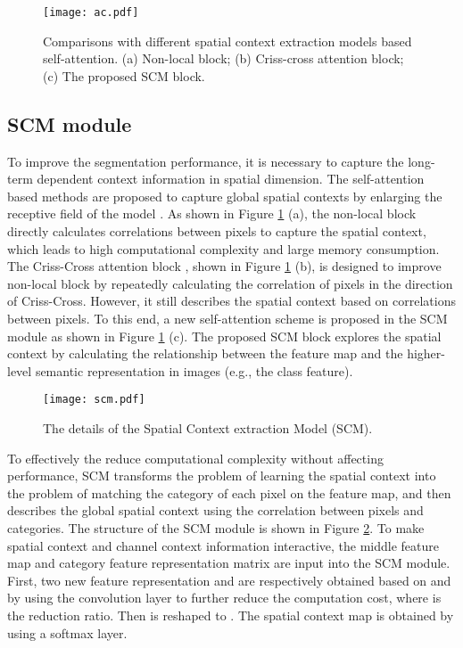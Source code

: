 \documentclass[10pt,journal,cspaper,compsoc]{IEEEtran}
\begin{document}
\begin{figure}
\centering
\texttt{[image: ac.pdf]}
\caption{Comparisons with different spatial context extraction models based self-attention. (a) Non-local block; (b) Criss-cross attention block; (c) The proposed SCM block.}
\label{fig5}
\vspace{-4mm}
\end{figure}
	
\subsection{SCM module}
To improve the segmentation performance, it is necessary to capture the long-term dependent context information in spatial dimension. The self-attention based methods are proposed to capture global spatial contexts by enlarging the receptive field of the model \cite{zhao2017pyramid, chen2017rethinking, lin2018multi}. As shown in Figure \ref{fig5} (a), the non-local block \cite{wang2018non} directly calculates correlations between pixels to capture the spatial context, which leads to high computational complexity and large memory consumption. The Criss-Cross attention block \cite{huang2019ccnet}, shown in Figure \ref{fig5} (b), is designed to improve non-local block by repeatedly calculating the correlation of pixels in the direction of Criss-Cross. However, it still describes the spatial context based on correlations between pixels. To this end, a new self-attention scheme is proposed in the SCM module as shown in Figure \ref{fig5} (c). The proposed SCM block explores the spatial context by calculating the relationship between the feature map and the higher-level semantic representation in images (e.g., the class feature).
\begin{figure}[t]
\centering
\texttt{[image: scm.pdf]}
\caption{The details of the Spatial Context extraction Model (SCM).}
\label{fig:scm}
\vspace{-4mm}
\end{figure}
	
To effectively the reduce computational complexity without affecting performance, SCM transforms the problem of learning the spatial context into the problem of matching the category of each pixel on the feature map, and then describes the global spatial context using the correlation between pixels and categories. The structure of the SCM module is shown in Figure \ref{fig:scm}. To make spatial context and channel context information interactive, the middle feature map  and category feature representation matrix  are input into the SCM module. First, two new feature representation  and  are respectively obtained based on  and  by using the convolution layer to further reduce the computation cost, where  is the reduction ratio. Then  is reshaped to . The spatial context map  is obtained by using a softmax layer.
\end{document}
